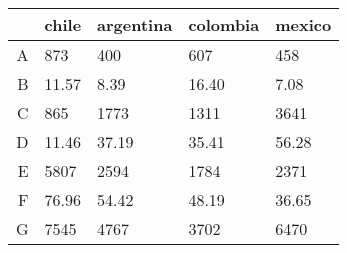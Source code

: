 \begin{table}[ht]
\centering
\begin{tabular}{rllll}
  \hline
 & chile & argentina & colombia & mexico \\ 
  \hline
A & 873 & 400 & 607 & 458 \\ 
  B & 11.57 & 8.39 & 16.40 & 7.08 \\ 
  C & 865 & 1773 & 1311 & 3641 \\ 
  D & 11.46 & 37.19 & 35.41 & 56.28 \\ 
  E & 5807 & 2594 & 1784 & 2371 \\ 
  F & 76.96 & 54.42 & 48.19 & 36.65 \\ 
  G & 7545 & 4767 & 3702 & 6470 \\ 
   \hline
\end{tabular}
\end{table}
